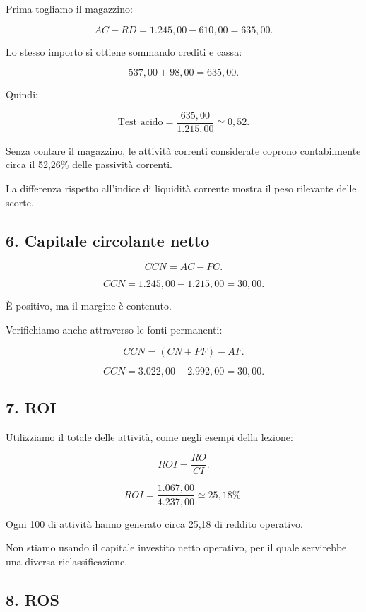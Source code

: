 \noindent Prima togliamo il magazzino:

\[
AC-RD=
1.245{,}00-610{,}00
=
635{,}00.
\]

\noindent Lo stesso importo
si ottiene sommando crediti e cassa:

\[
537{,}00+98{,}00
=
635{,}00.
\]

\noindent Quindi:

\[
\text{Test acido}
=
\frac{635{,}00}{1.215{,}00}
\simeq
\boxed{0{,}52}.
\]

\noindent Senza contare il magazzino,
le attività correnti considerate
coprono contabilmente
circa il 52,26\%
delle passività correnti.

\noindent La differenza rispetto
all'indice di liquidità corrente
mostra il peso rilevante delle scorte.


\subsection*{6. Capitale circolante netto}

\[
CCN=AC-PC.
\]

\[
CCN=
1.245{,}00-1.215{,}00
=
\boxed{30{,}00}.
\]

\noindent È positivo,
ma il margine è contenuto.

\noindent Verifichiamo anche
attraverso le fonti permanenti:

\[
CCN=(CN+PF)-AF.
\]

\[
CCN=
3.022{,}00-2.992{,}00
=
\boxed{30{,}00}.
\]


\subsection*{7. ROI}

\noindent Utilizziamo il totale delle attività,
come negli esempi della lezione:

\[
ROI=\frac{RO}{CI}.
\]

\[
ROI=
\frac{1.067{,}00}{4.237{,}00}
\simeq
\boxed{25{,}18\%}.
\]

\noindent Ogni 100 di attività
hanno generato circa 25,18
di reddito operativo.

\noindent Non stiamo usando
il capitale investito netto operativo,
per il quale servirebbe
una diversa riclassificazione.


\subsection*{8. ROS}

